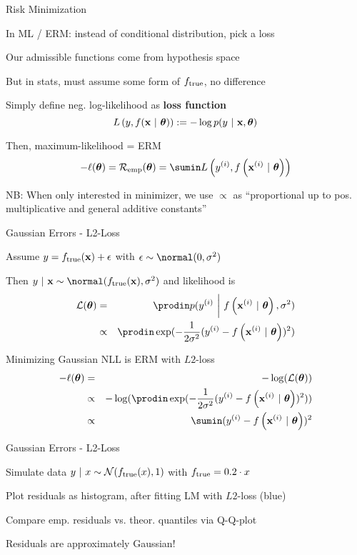 \documentclass[11pt,compress,t,notes=noshow, xcolor=table]{beamer}
\begin{document}
\begin{framei}[sep=M]{Risk Minimization} 

\item In ML / ERM: instead of conditional distribution, pick a loss 
\item Our admissible functions come from hypothesis space 
\item But in stats, must assume some form of $f_{\text{true}}$, no difference

\item Simply define neg. log-likelihood as \textbf{loss function} 
$$ L\left(y, f(\mathbf{x} ~|~ \bm{\theta})\right) := - \log p(y ~|~\mathbf{x}, \bm{\theta}) $$
\item Then, maximum-likelihood 
 = ERM
$$- \loglt = \risket = \sumin \Lxyit$$

\item NB: When only interested in minimizer, we use $\propto$ as \enquote{proportional up to pos. multiplicative and general additive constants}

\end{framei}


\begin{framei}[sep=M]{Gaussian Errors - L2-Loss} 

\item Assume $y = f_{\text{true}}(\mathbf{x}) + \epsilon$ with $\eps \sim \normal(0, \sigma^2)$ 
\item Then $y~|~\xv \sim \normal(\ftrue(\xv), \sigma^2)$ and likelihood is 
{\small
\begin{eqnarray*}
\LL(\thetav) &=& \prodin \pdf(\yi ~\bigg|~ \fxit, \sigma^2) \\ &\propto& \prodin \exp(-\frac{1}{2\sigma^2} (\yi - \fxit)^2)
\end{eqnarray*}
}


\item Minimizing Gaussian NLL is ERM with $L2$-loss
{\small
\begin{eqnarray*}
- \loglt &=& - \log(\LL(\thetav)) \\
&\propto& - \log(\prodin \exp(-\frac{1}{2\sigma^2} (\yi - \fxit)^2)) \\
&\propto& \sumin (\yi - \fxit)^2
\end{eqnarray*}
}

\end{framei}
\begin{framei}[sep=M]{Gaussian Errors - L2-Loss} 

\item Simulate data $y ~|~x \sim \mathcal{N}(f_{\text{true}}(x), 1)$ with $f_{\text{true}} = 0.2 \cdot x$ 
\item Plot residuals as histogram, after fitting LM with $L2$-loss (blue)
\item Compare emp. residuals vs. theor. quantiles via Q-Q-plot




\item Residuals are approximately Gaussian!

\end{framei}
\end{document}
